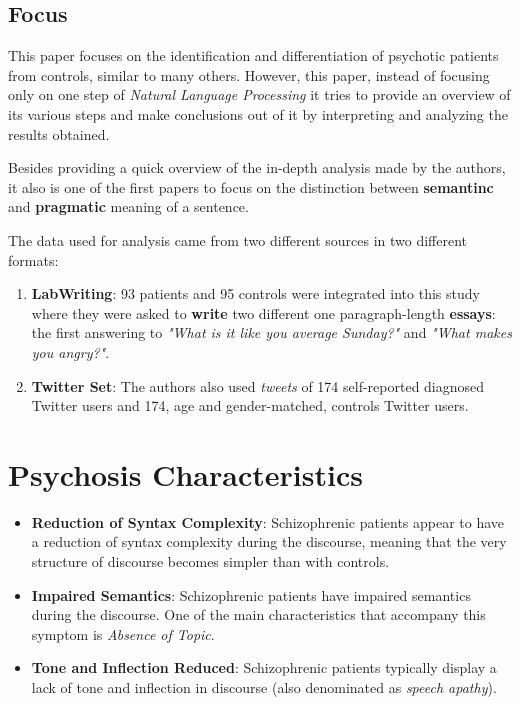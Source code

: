 \documentclass{Paper_Summary}
\begin{document}
\makepapertitle

\breakline

\begin{center}
    \section*{Focus}
\end{center}

    This paper focuses on the identification and differentiation of psychotic patients from controls, similar to many others. However, this paper, instead of focusing only on one step of \emph{Natural Language Processing} it tries to provide an overview of its various steps and make conclusions out of it by interpreting and analyzing the results obtained.

    Besides providing a quick overview of the in-depth analysis made by the authors, it also is one of the first papers to focus on the distinction between \textbf{semantinc} and \textbf{pragmatic} meaning of a sentence.

    The data used for analysis came from two different sources in two different formats:
    \begin{enumerate}
        \item \textbf{LabWriting}: 93 patients and 95 controls were integrated into this study where they were asked to \textbf{write} two different one paragraph-length \textbf{essays}: the first answering to \emph{"What is it like you average Sunday?"} and \emph{"What makes you angry?"}.
        \item \textbf{Twitter Set}: The authors also used \emph{tweets} of 174 self-reported diagnosed Twitter users and 174, age and gender-matched, controls Twitter users.
    \end{enumerate}

\breakline

\newpage

\section{Psychosis Characteristics}
    \begin{itemize}
        \item \textbf{Reduction of Syntax Complexity}: Schizophrenic patients appear to have a reduction of syntax complexity during the discourse, meaning that the very structure of discourse becomes simpler than with controls.
        \item \textbf{Impaired Semantics}: Schizophrenic patients have impaired semantics during the discourse. One of the main characteristics that accompany this symptom is \emph{Absence of Topic}.
        \item \textbf{Tone and Inflection Reduced}: Schizophrenic patients typically display a lack of tone and inflection in discourse (also denominated as \emph{speech apathy}).
    \end{itemize}
\end{document}
